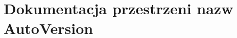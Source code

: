\hypertarget{namespace_auto_version}{\section{Dokumentacja przestrzeni nazw Auto\+Version}
\label{namespace_auto_version}
}

